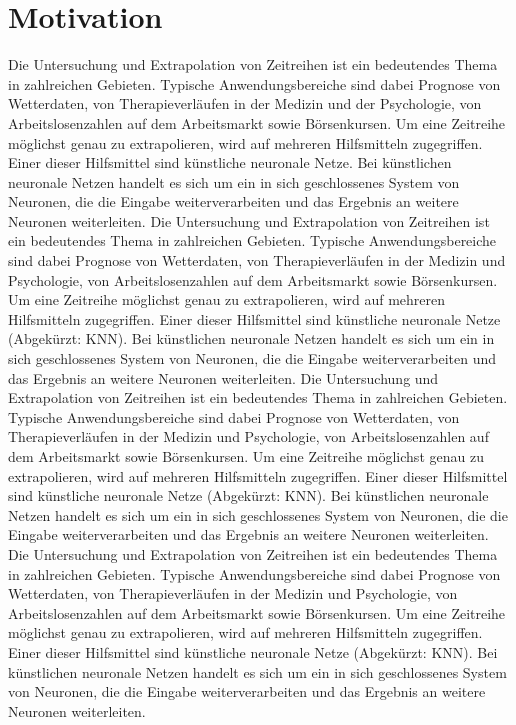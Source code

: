 \documentclass[a4paper,DIV11,bibliography=totoc,headings=normal,ngerman,headsepline]{scrreprt}
\begin{document}
\section{Motivation}
\label{sec:Motivation}
Die Untersuchung  und Extrapolation von Zeitreihen ist ein bedeutendes Thema in zahlreichen Gebieten. Typische Anwendungsbereiche sind dabei Prognose von Wetterdaten, von Therapieverläufen in der  Medizin und der Psychologie, von Arbeitslosenzahlen auf dem Arbeitsmarkt sowie Börsenkursen. Um eine Zeitreihe möglichst genau zu extrapolieren, wird auf mehreren Hilfsmitteln zugegriffen. Einer dieser Hilfsmittel sind künstliche neuronale Netze. Bei künstlichen neuronale Netzen handelt es sich um ein in sich geschlossenes System von Neuronen, die die Eingabe weiterverarbeiten und das Ergebnis an weitere Neuronen weiterleiten.  
Die Untersuchung  und Extrapolation von Zeitreihen ist ein bedeutendes Thema in zahlreichen Gebieten. Typische Anwendungsbereiche sind dabei Prognose von Wetterdaten, von Therapieverläufen in der  Medizin und Psychologie, von Arbeitslosenzahlen auf dem Arbeitsmarkt sowie Börsenkursen. Um eine Zeitreihe möglichst genau zu extrapolieren, wird auf mehreren Hilfsmitteln zugegriffen. Einer dieser Hilfsmittel sind künstliche neuronale Netze (Abgekürzt: KNN). Bei künstlichen neuronale Netzen handelt es sich um ein in sich geschlossenes System von Neuronen, die die Eingabe weiterverarbeiten und das Ergebnis an weitere Neuronen weiterleiten. 
Die Untersuchung  und Extrapolation von Zeitreihen ist ein bedeutendes Thema in zahlreichen Gebieten. Typische Anwendungsbereiche sind dabei Prognose von Wetterdaten, von Therapieverläufen in der  Medizin und Psychologie, von Arbeitslosenzahlen auf dem Arbeitsmarkt sowie Börsenkursen. Um eine Zeitreihe möglichst genau zu extrapolieren, wird auf mehreren Hilfsmitteln zugegriffen. Einer dieser Hilfsmittel sind künstliche neuronale Netze (Abgekürzt: KNN). Bei künstlichen neuronale Netzen handelt es sich um ein in sich geschlossenes System von Neuronen, die die Eingabe weiterverarbeiten und das Ergebnis an weitere Neuronen weiterleiten. 
Die Untersuchung  und Extrapolation von Zeitreihen ist ein bedeutendes Thema in zahlreichen Gebieten. Typische Anwendungsbereiche sind dabei Prognose von Wetterdaten, von Therapieverläufen in der  Medizin und Psychologie, von Arbeitslosenzahlen auf dem Arbeitsmarkt sowie Börsenkursen. Um eine Zeitreihe möglichst genau zu extrapolieren, wird auf mehreren Hilfsmitteln zugegriffen. Einer dieser Hilfsmittel sind künstliche neuronale Netze (Abgekürzt: KNN). Bei künstlichen neuronale Netzen handelt es sich um ein in sich geschlossenes System von Neuronen, die die Eingabe weiterverarbeiten und das Ergebnis an weitere Neuronen weiterleiten.
\end{document}
